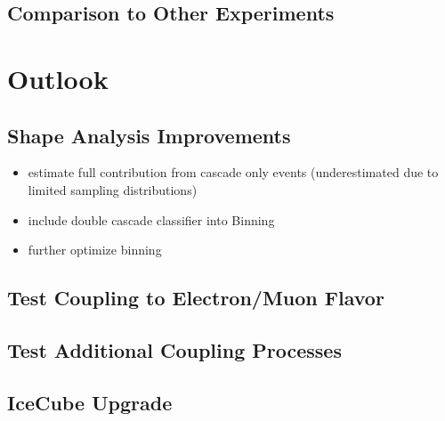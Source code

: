 
\subsection{Comparison to Other Experiments}






\section{Outlook}

\subsection{Shape Analysis Improvements}

\begin{itemize}
    \item estimate full contribution from cascade only events (underestimated due to limited sampling distributions)
    \item include double cascade classifier into Binning
    \item further optimize binning
\end{itemize}

\subsection{Test Coupling to Electron/Muon Flavor}

\subsection{Test Additional Coupling Processes}

\subsection{IceCube Upgrade}
